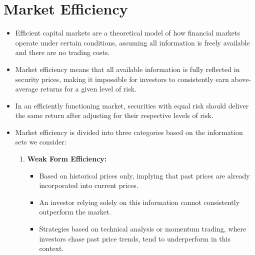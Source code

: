 \section{Market Efficiency}

\begin{itemize}
    \item Efficient capital markets are a theoretical model of how financial markets operate under certain conditions, assuming all information is freely available and there are no trading costs.
    \item Market efficiency means that all available information is fully reflected in security prices, making it impossible for investors to consistently earn above-average returns for a given level of risk.
    \item In an efficiently functioning market, securities with equal risk should deliver the same return after adjusting for their respective levels of risk.
    \item Market efficiency is divided into three categories based on the information sets we consider:
    
    \begin{enumerate}
        \item \textbf{Weak Form Efficiency: } 
        \begin{itemize}
            \item Based on historical prices only, implying that past prices are already incorporated into current prices. 
            \item An investor relying solely on this information cannot consistently outperform the market. 
            \item Strategies based on technical analysis or momentum trading, where investors chase past price trends, tend to underperform in this context.
        \end{itemize}


\end{enumerate}
\end{itemize}
